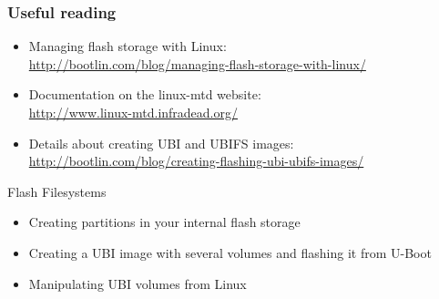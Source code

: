 \begin{frame}
  \frametitle{Useful reading}
  \begin{itemize}
  \item Managing flash storage with Linux:\\
    \url{http://bootlin.com/blog/managing-flash-storage-with-linux/}
  \item Documentation on the linux-mtd website:\\
    \url{http://www.linux-mtd.infradead.org/}
  \item Details about creating UBI and UBIFS images:\\
    \url{http://bootlin.com/blog/creating-flashing-ubi-ubifs-images/}
  \end{itemize}
\end{frame}

\setuplabframe
{Flash Filesystems}
{
  \begin{itemize}
  \item Creating partitions in your internal flash storage
  \item Creating a UBI image with several volumes and flashing it from
    U-Boot
  \item Manipulating UBI volumes from Linux
  \end{itemize}
}
